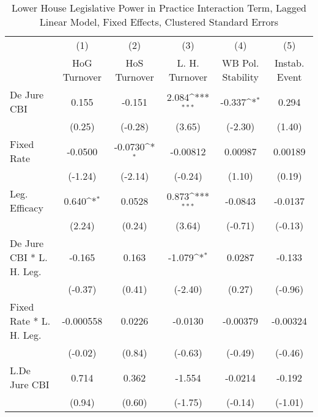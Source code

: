 {
\def\sym#1{\ifmmode^{#1}\else\(^{#1}\)\fi}
\begin{longtable}{l*{5}{c}}
\caption{Lower House Legislative Power in Practice Interaction Term, Lagged Linear Model, Fixed Effects, Clustered Standard Errors \label{llpintlagsDJ}}\\
\hline\hline\endfirsthead\hline\endhead\hline\endfoot\endlastfoot
                &\multicolumn{1}{c}{(1)}&\multicolumn{1}{c}{(2)}&\multicolumn{1}{c}{(3)}&\multicolumn{1}{c}{(4)}&\multicolumn{1}{c}{(5)}\\
                &\multicolumn{1}{c}{HoG Turnover}&\multicolumn{1}{c}{HoS Turnover}&\multicolumn{1}{c}{L. H. Turnover}&\multicolumn{1}{c}{WB Pol. Stability}&\multicolumn{1}{c}{Instab. Event}\\
\hline
De Jure CBI     &    0.155         &   -0.151         &    2.084\sym{***}&   -0.337\sym{*}  &    0.294         \\
                &   (0.25)         &  (-0.28)         &   (3.65)         &  (-2.30)         &   (1.40)         \\
[1em]
Fixed Rate      &  -0.0500         &  -0.0730\sym{*}  & -0.00812         &  0.00987         &  0.00189         \\
                &  (-1.24)         &  (-2.14)         &  (-0.24)         &   (1.10)         &   (0.19)         \\
[1em]
Leg. Efficacy   &    0.640\sym{*}  &   0.0528         &    0.873\sym{***}&  -0.0843         &  -0.0137         \\
                &   (2.24)         &   (0.24)         &   (3.64)         &  (-0.71)         &  (-0.13)         \\
[1em]
De Jure CBI * L. H. Leg.&   -0.165         &    0.163         &   -1.079\sym{*}  &   0.0287         &   -0.133         \\
                &  (-0.37)         &   (0.41)         &  (-2.40)         &   (0.27)         &  (-0.96)         \\
[1em]
Fixed Rate * L. H. Leg.&-0.000558         &   0.0226         &  -0.0130         & -0.00379         & -0.00324         \\
                &  (-0.02)         &   (0.84)         &  (-0.63)         &  (-0.49)         &  (-0.46)         \\
[1em]
L.De Jure CBI   &    0.714         &    0.362         &   -1.554         &  -0.0214         &   -0.192         \\
                &   (0.94)         &   (0.60)         &  (-1.75)         &  (-0.14)         &  (-1.01)         \\

\end{longtable}}
